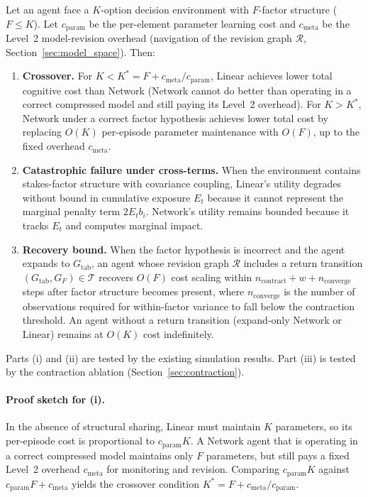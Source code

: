 \begin{proposition}\label{prop:crossover}
Let an agent face a $K$-option decision environment with $F$-factor structure
($F \leq K$).  Let $c_{\mathrm{param}}$ be the per-element parameter learning
cost and $c_{\mathrm{meta}}$ be the Level~2 model-revision overhead (navigation
of the revision graph $\mathcal{R}$, Section~\ref{sec:model_space}).  Then:

\begin{enumerate}[label=(\roman*)]
\item \textbf{Crossover.}
For $K < K^* = F + c_{\mathrm{meta}}/c_{\mathrm{param}}$, Linear achieves lower
total cognitive cost than Network (Network cannot do better than operating in a
correct compressed model and still paying its Level~2 overhead).
For $K > K^*$, Network under a correct factor hypothesis achieves lower total
cost by replacing $O(K)$ per-episode parameter maintenance with $O(F)$, up to the
fixed overhead $c_{\mathrm{meta}}$.

\item \textbf{Catastrophic failure under cross-terms.}
When the environment contains stakes-factor structure with covariance coupling,
Linear's utility degrades without bound in cumulative exposure $E_t$ because it
cannot represent the marginal penalty term $2E_t b_i$.  Network's utility
remains bounded because it tracks $E_t$ and computes marginal impact.

\item \textbf{Recovery bound.}
When the factor hypothesis is incorrect and the agent expands to
$G_{\mathrm{tab}}$, an agent whose revision graph $\mathcal{R}$ includes a
return transition $(G_{\mathrm{tab}}, G_F) \in \mathcal{T}$ recovers $O(F)$ cost
scaling within $n_{\mathrm{contract}} + w + n_{\mathrm{converge}}$ steps after
factor structure becomes present, where $n_{\mathrm{converge}}$ is the number of
observations required for within-factor variance to fall below the contraction
threshold.  An agent without a return transition (expand-only Network or Linear)
remains at $O(K)$ cost indefinitely.
\end{enumerate}

Parts (i) and (ii) are tested by the existing simulation results.
Part (iii) is tested by the contraction ablation
(Section~\ref{sec:contraction}).
\end{proposition}

\paragraph{Proof sketch for (i).}
In the absence of structural sharing, Linear must maintain $K$ parameters, so
its per-episode cost is proportional to $c_{\mathrm{param}}K$.  A Network agent
that is operating in a correct compressed model maintains only $F$ parameters,
but still pays a fixed Level~2 overhead $c_{\mathrm{meta}}$ for monitoring and
revision.  Comparing $c_{\mathrm{param}}K$ against $c_{\mathrm{param}}F +
c_{\mathrm{meta}}$ yields the crossover condition $K^* = F +
c_{\mathrm{meta}}/c_{\mathrm{param}}$.

